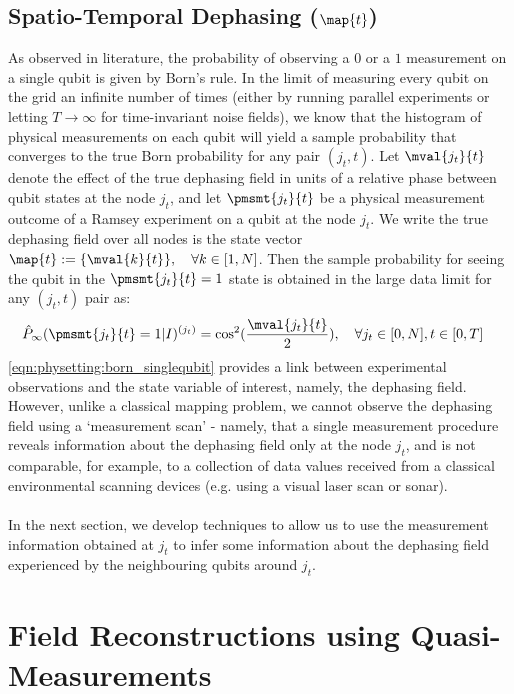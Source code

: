 \subsection{Spatio-Temporal Dephasing ($\map{t}$)} \label{sec:subsec:dephasing}

As observed in literature, the probability of observing a $0$ or a $1$ measurement on a single qubit is given by Born's rule. In the limit of measuring every qubit on the grid an infinite number of times (either by running parallel experiments or letting $T \to \infty$ for time-invariant noise fields), we know that the histogram of physical measurements on each qubit will yield a sample probability that converges to the true Born probability for any pair $(j_t,t)$. Let $\mval{j_t}{t}$ denote the effect of the true dephasing field in units of a relative phase between qubit states at the node $j_t$, and let $\pmsmt{j_t}{t}$ be a physical measurement outcome of a Ramsey experiment on a qubit at the node $j_t$. We write the true dephasing field over all nodes is the state vector $ \map{t}:=\{\mval{k}{t} \}, \quad \forall k \in [1,N]$. Then the sample probability for seeing the qubit in the  $\pmsmt{j_t}{t}=1$ state is obtained in the large data limit for any $(j_t, t)$ pair as: \\
\begin{align}
\hat{P}_\infty(\pmsmt{j_t}{t}=1|I)^{(j_t)} & = \cos^2(\frac{\mval{j_t}{t}}{2}), \quad \forall j_t \in [0, N], t \in [0, T] \label{eqn:physetting:born_singlequbit}
\end{align}
\cref{eqn:physetting:born_singlequbit} provides a link between experimental observations and the state variable of interest, namely, the dephasing field. However, unlike a classical mapping problem, we cannot observe the dephasing field using a `measurement scan' - namely, that a single measurement procedure reveals information about the dephasing field only at the node $j_t$, and is not comparable, for example, to a collection of data values received from a classical environmental scanning devices (e.g. using a visual laser scan or sonar). \\
\\
In the next section, we develop techniques to allow us to use the measurement information obtained at $j_t$ to infer some information about the dephasing field experienced by the neighbouring qubits around $j_t$.  


\section{ Field Reconstructions using Quasi-Measurements }  \label{sec:fieldreconstruct}

